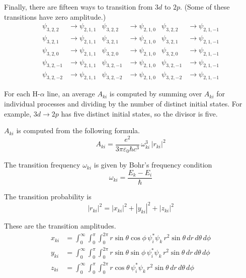 Finally, there are fifteen ways to transition from $3d$ to $2p$.
(Some of these transitions have zero amplitude.)
\begin{align*}
\psi_{3,2,2}&\rightarrow\psi_{2,1,1} &
\psi_{3,2,2}&\rightarrow\psi_{2,1,0} &
\psi_{3,2,2}&\rightarrow\psi_{2,1,-1}
\\
\psi_{3,2,1}&\rightarrow\psi_{2,1,1} &
\psi_{3,2,1}&\rightarrow\psi_{2,1,0} &
\psi_{3,2,1}&\rightarrow\psi_{2,1,-1}
\\
\psi_{3,2,0}&\rightarrow\psi_{2,1,1} &
\psi_{3,2,0}&\rightarrow\psi_{2,1,0} &
\psi_{3,2,0}&\rightarrow\psi_{2,1,-1}
\\
\psi_{3,2,-1}&\rightarrow\psi_{2,1,1} &
\psi_{3,2,-1}&\rightarrow\psi_{2,1,0} &
\psi_{3,2,-1}&\rightarrow\psi_{2,1,-1}
\\
\psi_{3,2,-2}&\rightarrow\psi_{2,1,1} &
\psi_{3,2,-2}&\rightarrow\psi_{2,1,0} &
\psi_{3,2,-2}&\rightarrow\psi_{2,1,-1}
\end{align*}

For each H-$\alpha$ line, an average $A_{ki}$ is computed by summing over $A_{ki}$ for individual processes
and dividing by the number of distinct initial states.
For example, $3d\rightarrow2p$ has five distinct initial states, so the divisor is five.

\bigskip
$A_{ki}$ is computed from the following formula.
\begin{equation*}
A_{ki}=\frac{e^2}{3\pi\varepsilon_0\hbar c^3}\,\omega_{ki}^3\,|r_{ki}|^2
\end{equation*}

The transition frequency $\omega_{ki}$ is given by Bohr's frequency condition
\begin{equation*}
\omega_{ki}=\frac{E_k-E_i}{\hbar}
\end{equation*}

The transition probability is
\begin{equation*}
|r_{ki}|^2
=|x_{ki}|^2
+|y_{ki}|^2
+|z_{ki}|^2
\end{equation*}

These are the transition amplitudes.
\begin{align*}
x_{ki}&=\int_0^\infty\int_0^\pi\int_0^{2\pi}
r\sin\theta\cos\phi\,\psi_i^*\psi_k
\,r^2\sin\theta\,dr\,d\theta\,d\phi
\\
y_{ki}&=\int_0^\infty\int_0^\pi\int_0^{2\pi}
r\sin\theta\sin\phi\,\psi_i^*\psi_k
\,r^2\sin\theta\,dr\,d\theta\,d\phi
\\
z_{ki}&=\int_0^\infty\int_0^\pi\int_0^{2\pi}
r\cos\theta\,\psi_i^*\psi_k
\,r^2\sin\theta\,dr\,d\theta\,d\phi
\end{align*}

